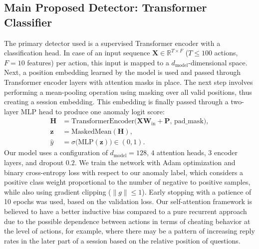 \documentclass[sigconf]{acmart}
\begin{document}
\subsection{Main Proposed Detector: Transformer Classifier}
The primary detector used is a supervised Transformer encoder with a classification head. In case of an input sequence $\mathbf{X} \in \mathbb{R}^{T \times F}$ ($T \le 100$ actions, $F = 10$ features) per action, this input is mapped to a $d_{\text{model}}$-dimensional space. Next, a position embedding learned by the model is used and passed through Transformer encoder layers with attention masks in place. The next step involves performing a mean-pooling operation using masking over all valid positions, thus creating a session embedding. This embedding is finally passed through a two-layer MLP head to produce one anomaly logit score:
\begin{align}
\mathbf{H} &= \text{TransformerEncoder}\bigl(\mathbf{X}\mathbf{W}_{\text{in}} + \mathbf{P},\, \text{pad\_mask}\bigr),\\
\mathbf{z} &= \text{MaskedMean}(\mathbf{H}),\\
\hat{y} &= \sigma\bigl(\text{MLP}(\mathbf{z})\bigr) \in (0,1).
\end{align}
Our model uses a configuration of $d_{\text{model}} = 128$, $4$ attention heads, $3$ encoder layers, and dropout $0.2$. We train the network with Adam optimization and binary cross-entropy loss with respect to our anomaly label, which considers a positive class weight proportional to the number of negative to positive samples, while also using gradient clipping ($\lVert g \rVert \le 1$). Early stopping with a patience of 10 epochs was used, based on the validation loss. Our self-attention framework is believed to have a better inductive bias compared to a pure recurrent approach due to the possible dependence between actions in terms of cheating behavior at the level of actions, for example, where there may be a pattern of increasing reply rates in the later part of a session based on the relative position of questions.
\end{document}
